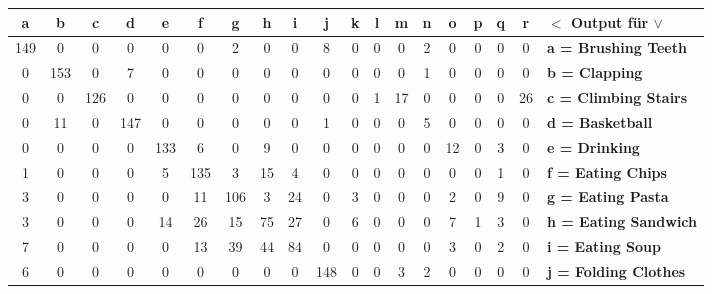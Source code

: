 \begin{table}
	\centering
	\begin{tabular}{|c|c|c|c|c|c|c|c|c|c|c|c|c|c|c|c|c|c||l|}
		\hline 
		\textbf{a} &  \textbf{b} & \textbf{c} & \textbf{d} & \textbf{e} & \textbf{f} & \textbf{g} & \textbf{h} & \textbf{i} & \textbf{j} & \textbf{k} & \textbf{l} & \textbf{m} & \textbf{n} & \textbf{o} & \textbf{p} & \textbf{q} & \textbf{r} & \textbf{$<$ Output für $\vee$} \\
		\hline 
		\hline 
		149 & 0 & 0 & 0 & 0 & 0 & 2 & 0 & 0 & 8 & 0 & 0 & 0 & 2 & 0 & 0 & 0 & 0 & \textbf{a = Brushing Teeth} \\
		\hline 
		0 & 153 & 0 & 7 & 0 & 0 & 0 & 0 & 0 & 0 & 0 & 0 & 0 & 1 & 0 & 0 & 0 & 0 & \textbf{b = Clapping} \\
		\hline 
		0 & 0 & 126 & 0 & 0 & 0 & 0 & 0 & 0 & 0 & 0 & 1 &17 & 0 & 0 & 0 & 0 & 26 & \textbf{c = Climbing Stairs} \\
		\hline 
		0 & 11 & 0 & 147 & 0 & 0 & 0 & 0 & 0 & 1 & 0 & 0 & 0 & 5 & 0 & 0 & 0 & 0 & \textbf{d = Basketball} \\
		\hline 
		0 & 0 & 0 & 0 & \cellcolor{lightgray} 133 & \cellcolor{lightgray} 6 & \cellcolor{lightgray} 0 & \cellcolor{lightgray} 9 & \cellcolor{lightgray}  0 & 0 & 0 & 0 & 0 & 0 & 12 & 0 & 3 & 0 & \textbf{e = Drinking} \\
		\hline 
		1 & 0 & 0 & 0 & \cellcolor{lightgray} 5 & \cellcolor{lightgray} 135 & \cellcolor{lightgray} 3 & \cellcolor{lightgray} 15 & \cellcolor{lightgray} 4 & 0 & 0 & 0 & 0 & 0 & 0 & 0 & 1 & 0 & \textbf{f = Eating Chips} \\
		\hline 
		3 & 0 & 0 & 0 & \cellcolor{lightgray} 0 & \cellcolor{lightgray} \cellcolor{lightgray} 11 & \cellcolor{lightgray} 106 & \cellcolor{lightgray} 3 & \cellcolor{lightgray} 24 & 0 & 3 & 0 & 0 & 0 & 2 & 0 & 9 & 0 & \textbf{g = Eating Pasta} \\
		\hline 
		3 & 0 & 0 & 0 & \cellcolor{lightgray} 14 & \cellcolor{lightgray} 26 & \cellcolor{lightgray} 15 & \cellcolor{lightgray} 75 & \cellcolor{lightgray} 27 & 0 & 6 & 0 & 0 & 0 & 7 & 1 & 3 & 0 & \textbf{h = Eating Sandwich} \\
		\hline 
		7 & 0 & 0 & 0 & \cellcolor{lightgray} 0 & \cellcolor{lightgray} 13 & \cellcolor{lightgray} 39 & \cellcolor{lightgray} 44 & \cellcolor{lightgray} 84 & 0 & 0 & 0 & 0 & 0 & 3 & 0 & 2 & 0 & \textbf{i = Eating Soup} \\
		\hline 
		6 & 0 & 0 & 0 & 0 & 0 & 0 & 0 & 0 & 148 & 0 & 0 & 3 & 2 & 0 & 0 & 0 & 0 & \textbf{j = Folding Clothes} \\

\end{tabular}
\end{table}
